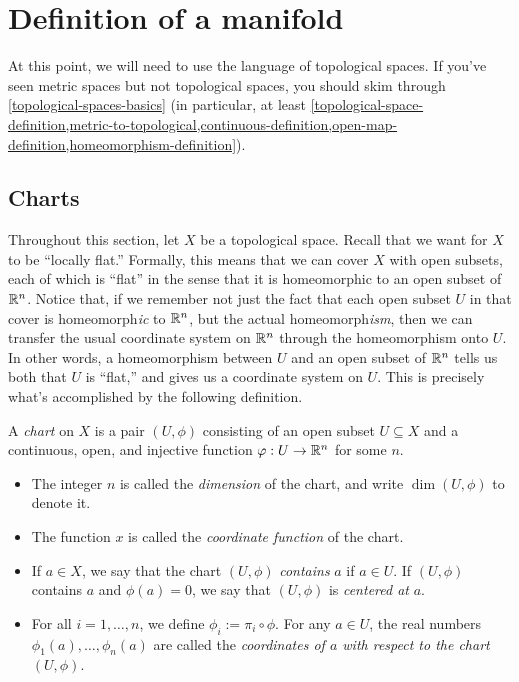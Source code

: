 \section{Definition of a manifold}

At this point, we will need to use the language of topological spaces. If you've seen metric spaces but not topological spaces, you should skim through \cref{topological-spaces-basics} (in particular, at least \cref{topological-space-definition,metric-to-topological,continuous-definition,open-map-definition,homeomorphism-definition}).

\subsection{Charts}

Throughout this section, let $X$ be a topological space. Recall that we want for $X$ to be ``locally flat.'' Formally, this means that we can cover $X$ with open subsets, each of which is ``flat'' in the sense that it is homeomorphic to an open subset of $\mathbb{R}^n$. Notice that, if we remember not just the fact that each open subset $U$ in that cover is homeomorph\emph{ic} to $\mathbb{R}^n$, but the actual homeomorph\emph{ism}, then we can transfer the usual coordinate system on $\mathbb{R}^n$ through the homeomorphism onto $U$. In other words, a homeomorphism between $U$ and an open subset of $\mathbb{R}^n$ tells us both that $U$ is ``flat,'' and gives us a coordinate system on $U$. This is precisely what's accomplished by the following definition. 

\begin{definition}[Chart] 
	A \emph{chart} on $X$ is a pair $(U, \phi)$ consisting of an open subset $U \subseteq X$ and a continuous, open, and injective function $\varphi : U \to \mathbb{R}^n$ for some $n$. 
	\begin{itemize}
		\item The integer $n$ is called the \emph{dimension} of the chart, and write $\dim (U,\phi)$ to denote it. 
		\item The function $x$ is called the \emph{coordinate function} of the chart. 
		\item If $a \in X$, we say that the chart $(U,\phi)$ \emph{contains} $a$ if $a \in U$. If $(U,\phi)$ contains $a$ and $\phi(a) = 0$, we say that $(U,\phi)$ is \emph{centered at} $a$. 
		\item For all $i = 1, \dotsc, n$, we define $\phi_i := \pi_i \circ \phi$. For any $a \in U$, the real numbers $\phi_1(a), \dotsc, \phi_n(a)$ are called the \emph{coordinates of $a$ with respect to the chart  $(U,\phi)$}.
	\end{itemize} 
\end{definition}

